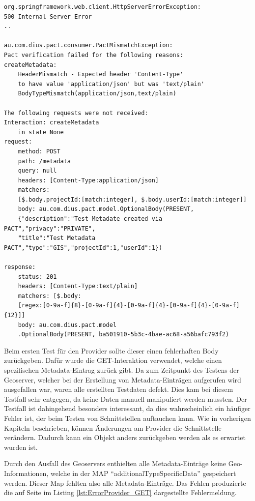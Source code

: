 \documentclass{llncs}
\begin{document}
\begin{lstlisting}[caption=Fehler im Header,label={lst:ErrorHeaderConsumer}]
org.springframework.web.client.HttpServerErrorException: 
500 Internal Server Error
..

au.com.dius.pact.consumer.PactMismatchException: 
Pact verification failed for the following reasons:
createMetadata:
    HeaderMismatch - Expected header 'Content-Type' 
    to have value 'application/json' but was 'text/plain'
    BodyTypeMismatch(application/json,text/plain)

The following requests were not received:
Interaction: createMetadata
	in state None
request:
	method: POST
	path: /metadata
	query: null
	headers: [Content-Type:application/json]
	matchers: 
	[$.body.projectId:[match:integer], $.body.userId:[match:integer]]
	body: au.com.dius.pact.model.OptionalBody(PRESENT, 
	{"description":"Test Metadate created via PACT","privacy":"PRIVATE",
	"title":"Test Metadata PACT","type":"GIS","projectId":1,"userId":1})

response:
	status: 201 
	headers: [Content-Type:text/plain] 
	matchers: [$.body:
	[regex:[0-9a-f]{8}-[0-9a-f]{4}-[0-9a-f]{4}-[0-9a-f]{4}-[0-9a-f]{12}]] 
	body: au.com.dius.pact.model
	.OptionalBody(PRESENT, ba501910-5b3c-4bae-ac68-a56bafc793f2)
\end{lstlisting}

Beim ersten Test für den Provider sollte dieser einen fehlerhaften Body zurückgeben. Dafür wurde die GET-Interaktion verwendet, welche einen spezifischen Metadata-Eintrag zurück gibt. Da zum Zeitpunkt des Testens der Geoserver, welcher bei der Erstellung von Metadata-Einträgen aufgerufen wird ausgefallen war, waren alle erstellten Testdaten defekt. Dies kam bei diesem Testfall sehr entgegen, da keine Daten manuell manipuliert werden mussten. Der Testfall ist dahingehend besonders interessant, da dies wahrscheinlich ein häufiger Fehler ist, der beim Testen von Schnittstellen auftauchen kann. Wie in vorherigen Kapiteln beschrieben, können Änderungen am Provider die Schnittstelle verändern. Dadurch kann ein Objekt anders zurückgeben werden als es erwartet wurden ist. 

Durch den Ausfall des Geoservers enthielten alle Metadata-Einträge keine Geo-Informationen, welche in der MAP \enquote{additionalTypeSpecificData} gespeichert werden. Dieser Map fehlten also alle Metadata-Einträge. Das Fehlen produzierte die auf Seite \pageref{lst:ErrorProvider_GET} im Listing \ref{lst:ErrorProvider_GET} dargestellte Fehlermeldung.
\end{document}
